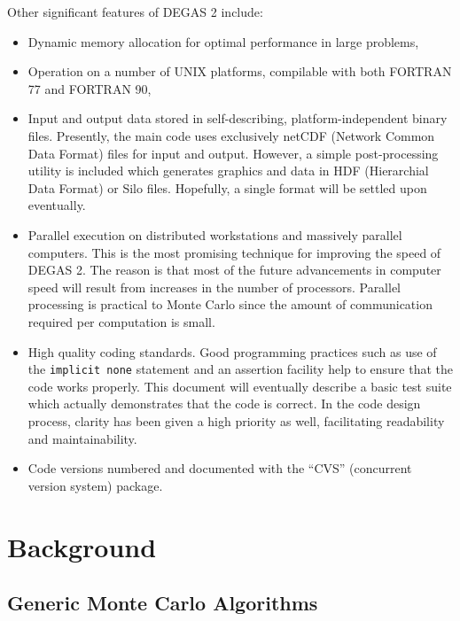\documentclass[12pt]{report}
\begin{document}
Other significant features of DEGAS 2 include:
\begin{itemize}
\item Dynamic memory allocation for optimal performance in large problems,
\item Operation on a number of UNIX platforms, compilable with both 
FORTRAN 77 and FORTRAN 90,
\item Input and output data stored in self-describing, platform-independent 
binary files.
Presently, the main code uses exclusively
netCDF\cite{nCDF} (Network Common Data
Format) files for input and output. However, a simple post-processing
utility is included which generates graphics and data in  
HDF\cite{HDF} (Hierarchial Data Format) or Silo\cite{Silo} files. 
Hopefully, a single format will be settled upon eventually.
\item Parallel execution on distributed workstations and massively
parallel computers. This is the most promising
technique for improving the speed of DEGAS 2.  The reason is that most of
the future advancements in computer speed will result from increases in the
number of processors. Parallel processing is practical to Monte Carlo since
the amount of communication required per computation is small.
\item High quality coding standards.
Good programming practices such as use of the {\tt implicit none} statement
and an assertion facility help to ensure that the code works properly. 
This document will eventually describe a basic test suite which actually
demonstrates that the code is correct. In the code design process, clarity
has been given a high priority as well, facilitating readability and
maintainability.
\item Code versions numbered and documented with the ``CVS'' (concurrent
version system) package.
\end{itemize}

\chapter{Background}

\section{Generic Monte Carlo Algorithms}
\end{document}

